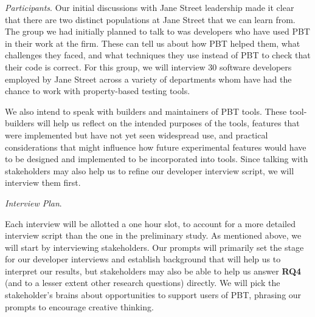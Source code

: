 \textit{Participants}.
Our initial discussions with Jane Street leadership made it clear that there are
two distinct populations at Jane Street that we can learn from. The group we had
initially planned to talk to was developers who have used PBT in
their work at the firm. These can tell us about how PBT helped them,
what challenges they faced, and what techniques they use instead of
PBT to check that their code is correct. For this group, we will interview 30 software developers employed by Jane Street across a variety of departments whom have had the chance to work with property-based testing tools.

We also intend to speak with builders and maintainers of PBT tools. These
tool-builders will help us reflect on the intended purposes of the tools,
features that were implemented but have not yet seen widespread use, and
practical considerations that might influence how future experimental features
would have to be designed and implemented to be incorporated into tools. Since talking with
stakeholders may also help us to refine our developer interview script, we will
interview them first.




\textit{Interview Plan}.

Each interview will be allotted a one hour slot, to account for a more detailed
interview script than the one in the preliminary study. As mentioned above, we
will start by interviewing stakeholders. Our prompts will primarily set the
stage for our developer interviews and establish background that will help us to
interpret our results, but stakeholders may also be able to help us answer {\bf
RQ4} (and to a lesser extent other research questions) directly. We will pick
the stakeholder's brains about opportunities to support users
of PBT, phrasing our prompts to encourage creative thinking.

